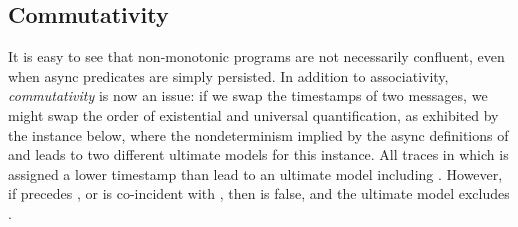 



\subsection{Commutativity}

It is easy to see that non-monotonic programs are not necessarily confluent,
even when async predicates are simply persisted.  In addition to associativity,
{\em commutativity} is now an issue: if we swap the timestamps of two messages,
we might swap the order of existential and universal quantification, as
exhibited by the instance below, where the 
nondeterminism implied by the async definitions of  and 
leads to two different ultimate models for this instance.  All traces in which
 is assigned a lower timestamp than  lead to an ultimate
model including .  However, if  precedes
, or is co-incident with , then 
is false, and the ultimate model excludes .

